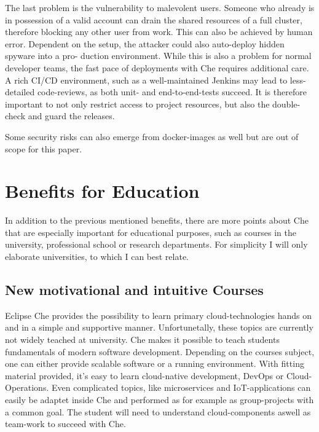 \documentclass[utf8]{lni}
\begin{document}
The last problem is the vulnerability to malevolent users. 
Someone who already is in possession of a valid account can drain the shared resources of a full cluster, therefore blocking  any  other  user  from  work.
This  can  also  be achieved by human error. 
Dependent on the setup, the attacker could also auto-deploy hidden spyware into a pro-
duction environment. 
While this is also a problem for normal developer teams, the fast pace of deployments with Che requires additional care. 
A rich CI/CD environment, such as a well-maintained Jenkins may lead to less-detailed code-reviews, as both unit- and end-to-end-tests succeed.  
It is therefore important to not only restrict access to project resources, but also the double-check and guard the releases.
  
Some security risks can also emerge from docker-images as well \cite{PE13} but are out of scope for this paper.

\section{Benefits for Education}
\label{sec:EvalEdu}
In addition to the previous mentioned benefits, there are more points about Che that are especially important for educational purposes, such as courses in the university, professional school or research departments.
For simplicity I will only elaborate universities, to which I can best relate.
\subsection{New motivational and intuitive Courses}
Eclipse Che provides the possibility to learn primary cloud-technologies hands on and in a simple and supportive manner. 
Unfortunetally, these topics are currently not widely teached at university.
Che makes it possible to teach students fundamentals of modern software development.
Depending on the courses subject, one can either provide scalable software or a running environment. 
With fitting material provided, it's easy to learn cloud-native development, DevOps or Cloud-Operations. 
Even complicated topics, like microservices and IoT-applications can easily be adaptet inside Che \cite{IV18} and performed as for example as group-projects with a common goal. 
The student will need to understand cloud-components aswell as team-work to succeed with Che. 
\end{document}
